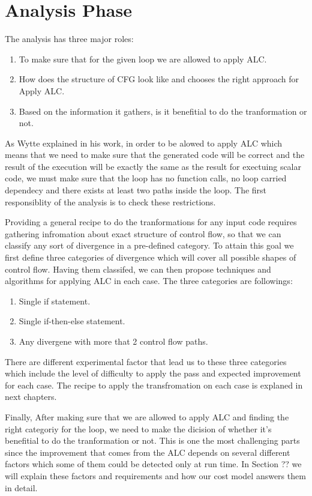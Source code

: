 \documentclass[\main/thesis.tex]{subfiles}
\begin{document}











\section{Analysis Phase}

The analysis has three major roles:
\begin{enumerate}
    \item To make sure that for the given loop we are allowed to apply ALC.
    \item How does the structure of CFG look like and chooses the right approach for Apply ALC.
    \item Based on the information it gathers, is it benefitial to do the tranformation or not.
\end{enumerate}

As Wytte explained in his work, in order to be alowed to apply ALC which means that we need to make sure that the generated code will be correct and the result of the execution will be exactly the same as the result for exectuing scalar code, we must make sure that the loop has no function calls, no loop carried dependecy and there exists at least two paths inside the loop. The first responsiblity of the analysis is to check these restrictions.

Providing a general recipe to do the tranformations for any input code requires gathering infromation about exact structure of control flow, so that we can classify any sort of divergence in a pre-defined category. To attain this goal we first define three categories of divergence
which will cover all possible shapes of control flow. Having them classifed, we can then propose techniques and algorithms for applying ALC in each case. The three categories are followings:

\begin{enumerate}
    \item Single if statement.
    \item Single if-then-else statement.
    \item Any divergene with more that 2 control flow paths.
\end{enumerate}

There are different experimental factor that lead us to these three categories which include the level of difficulty to apply the pass and expected improvement for each case. The recipe to apply the transfromation on each case is explaned in next chapters.

Finally, After making sure that we are allowed to apply ALC and finding the right categoriy for the loop, we need to make the dicision of whether it's benefitial to do the tranformation or not. This is one the most challenging parts since the improvement that comes from the ALC depends on several different factors which some of them could be detected only at run time. In Section ?? we will explain these factors and requirements and how our cost model answers them in detail.   
\end{document}
